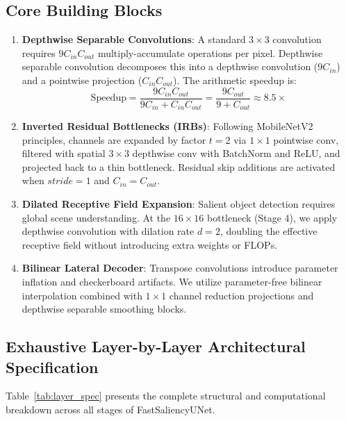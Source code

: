 \documentclass[10pt,a4paper]{article}
\begin{document}
\subsection{Core Building Blocks}
\begin{enumerate}
    \item \textbf{Depthwise Separable Convolutions}: A standard $3 \times 3$ convolution requires $9 C_{in} C_{out}$ multiply-accumulate operations per pixel. Depthwise separable convolution decomposes this into a depthwise convolution ($9 C_{in}$) and a pointwise projection ($C_{in} C_{out}$). The arithmetic speedup is:
    \begin{equation}
    \text{Speedup} = \frac{9 C_{in} C_{out}}{9 C_{in} + C_{in} C_{out}} = \frac{9 C_{out}}{9 + C_{out}} \approx 8.5\times
    \end{equation}
    \item \textbf{Inverted Residual Bottlenecks (IRBs)}: Following MobileNetV2 principles, channels are expanded by factor $t=2$ via $1 \times 1$ pointwise conv, filtered with spatial $3 \times 3$ depthwise conv with BatchNorm and ReLU, and projected back to a thin bottleneck. Residual skip additions are activated when $stride=1$ and $C_{in}=C_{out}$.
    \item \textbf{Dilated Receptive Field Expansion}: Salient object detection requires global scene understanding. At the $16 \times 16$ bottleneck (Stage 4), we apply depthwise convolution with dilation rate $d=2$, doubling the effective receptive field without introducing extra weights or FLOPs.
    \item \textbf{Bilinear Lateral Decoder}: Transpose convolutions introduce parameter inflation and checkerboard artifacts. We utilize parameter-free bilinear interpolation combined with $1\times 1$ channel reduction projections and depthwise separable smoothing blocks.
\end{enumerate}

\subsection{Exhaustive Layer-by-Layer Architectural Specification}

Table~\ref{tab:layer_spec} presents the complete structural and computational breakdown across all stages of FastSaliencyUNet.
\end{document}
